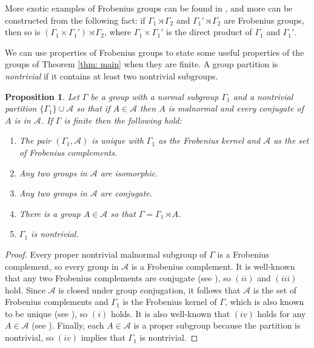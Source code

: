 \documentclass[12pt]{article}
\newtheorem{proposition}[theorem]{Proposition}
\theoremstyle{definition}
\newcommand{\cA}{\mathcal{A}}
\begin{document}
More exotic examples of Frobenius groups can be found in \cite{Starostin-1971}, and more can be constructed from the following fact: if $\Gamma_1 \rtimes \Gamma_2$ and $\Gamma_1' \rtimes \Gamma_2$ are Frobenius groups, then so is $(\Gamma_1 \times \Gamma_1') \rtimes \Gamma_2$, where $\Gamma_1 \times \Gamma_1'$ is the direct product of $\Gamma_1$ and $\Gamma_1'$.

We can use properties of Frobenius groups to state some useful properties of the groups of Theorem \ref{thm: main} when they are finite.
A group partition is \emph{nontrivial} if it contains at least two nontrivial subgroups.


\begin{proposition} \label{prop: Frobenius properties}
Let $\Gamma$ be a group with a normal subgroup $\Gamma_1$ and a nontrivial partition $\{\Gamma_1\} \cup \cA$ so that if $A \in \cA$ then $A$ is malnormal and every conjugate of $A$ is in $\cA$.
If $\Gamma$ is finite then the following hold:
\begin{enumerate}[label=$(\roman*)$]

\item The pair $(\Gamma_1, \cA)$ is unique with $\Gamma_1$ as the Frobenius kernel and $\cA$ as the set of Frobenius complements.

\item Any two groups in $\cA$ are isomorphic.

\item Any two groups in $\cA$ are conjugate.

\item There is a group $A \in \cA$ so that $\Gamma = \Gamma_1 \rtimes A$.

\item $\Gamma_1$ is nontrivial.
\end{enumerate}
\end{proposition}
\begin{proof}
Every proper nontrivial malnormal subgroup of $\Gamma$ is a Frobenius complement, so every group in $\cA$ is a Frobenius complement.
It is well-known that any two Frobenius complements are conjugate (see \cite[Theorem 4.2]{Frobenius-groups}), so $(ii)$ and $(iii)$ hold.
Since $\cA$ is closed under group conjugation, it follows that $\cA$ is the set of Frobenius complements and $\Gamma_1$ is the Frobenius kernel of $\Gamma$, which is also known to be unique (see \cite[Theorem 4.2]{Frobenius-groups}), so $(i)$ holds.
It is also well-known that $(iv)$ holds for any $A \in \cA$ (see \cite[Theorem 1.2]{Frobenius-groups}).
Finally, each $A \in \cA$ is a proper subgroup because the partition is nontrivial, so $(iv)$ implies that $\Gamma_1$ is nontrivial.
\end{proof}
\end{document}
